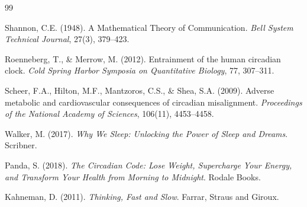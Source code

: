 \documentclass[12pt,letterpaper]{article}
\begin{document}
\begin{thebibliography}{99}

Shannon, C.E. (1948). A Mathematical Theory of Communication. \textit{Bell System Technical Journal}, 27(3), 379--423.

Roenneberg, T., \& Merrow, M. (2012). Entrainment of the human circadian clock. \textit{Cold Spring Harbor Symposia on Quantitative Biology}, 77, 307--311.

Scheer, F.A., Hilton, M.F., Mantzoros, C.S., \& Shea, S.A. (2009). Adverse metabolic and cardiovascular consequences of circadian misalignment. \textit{Proceedings of the National Academy of Sciences}, 106(11), 4453--4458.

Walker, M. (2017). \textit{Why We Sleep: Unlocking the Power of Sleep and Dreams}. Scribner.

Panda, S. (2018). \textit{The Circadian Code: Lose Weight, Supercharge Your Energy, and Transform Your Health from Morning to Midnight}. Rodale Books.

Kahneman, D. (2011). \textit{Thinking, Fast and Slow}. Farrar, Straus and Giroux.

\end{thebibliography}
\end{document}
